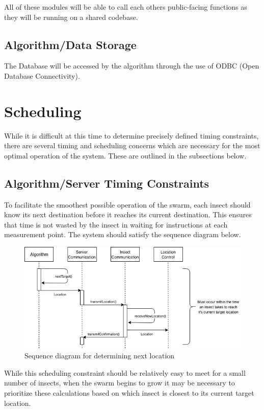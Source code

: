 \documentclass[11pt]{article}
\begin{document}
All of these modules will be able to call each others public-facing functions as they will be running on a shared codebase.
\subsection{Algorithm/Data Storage}
The Database will be accessed by the algorithm through the use of ODBC (Open Database Connectivity).

\section{Scheduling}
While it is difficult at this time to determine precisely defined timing constraints, there are several timing and scheduling concerns which are necessary for the most optimal operation of the system. These are outlined in the subsections below.

\subsection{Algorithm/Server Timing Constraints}
To facilitate the smoothest possible operation of the swarm, each insect should know its next destination before it reaches its current destination. This ensures that time is not wasted by the insect in waiting for instructions at each measurement point. The system should satisfy the sequence diagram below.
\begin{figure}[H]
   \centering
   \includegraphics[width=1\textwidth]{diagram/next_target_sequence.png}
   \caption{Sequence diagram for determining next location}
\end{figure}
While this scheduling constraint should be relatively easy to meet for a small number of insects, when the swarm begins to grow it may be necessary to prioritize these calculations based on which insect is closest to its current target location.
\end{document}
